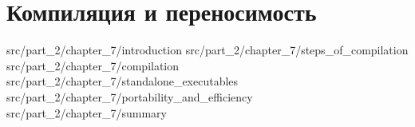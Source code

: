 \chapter{Компиляция и переносимость}
\label{chpt:compilation_and_portability}

 {src/part_2/chapter_7/introduction}
 {src/part_2/chapter_7/steps_of_compilation}
 {src/part_2/chapter_7/compilation}
 {src/part_2/chapter_7/standalone_executables}
 {src/part_2/chapter_7/portability_and_efficiency}
 {src/part_2/chapter_7/summary}